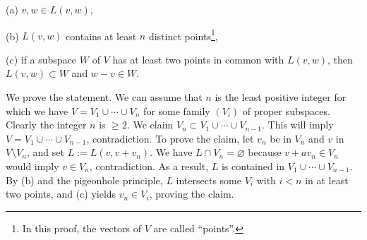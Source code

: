 \documentclass[11pt,letterpaper]{article}
\newcommand{\noi}{\noindent}%
\newcommand{\sm}{\setminus}
\begin{document}
\noi(a) $v,w\in L(v,w)$, 

\noi(b) $L(v,w)$ contains at least $n$ distinct points\footnote{In this proof, the vectors of $V$ are called ``points''.}, 

\noi(c) if a subspace $W$ of $V$ has at least two points in common with $L(v,w)$, then $L(v,w)\subset W$ and $w-v\in W$. 

\noi We prove the statement. We can assume that $n$ is the least positive integer for which we have $V=V_1\cup\cdots\cup V_n$ for some family $(V_i)$ of proper subspaces. Clearly the integer $n$ is $\ge2$. We claim $V_n\subset V_1\cup\cdots\cup V_{n-1}$. This will imply $V=V_1\cup\cdots\cup V_{n-1}$, contradiction. To prove the claim, let $v_n$ be in $V_n$ and $v$ in $V\sm V_n$, and set $L:=L(v,v+v_n)$. We have $L\cap V_n=\varnothing$ because $v+av_n\in V_n$ would imply $v\in V_n$, contradiction. As a result, $L$ is contained in $V_1\cup\cdots\cup V_{n-1}$. By (b) and the pigeonhole principle, $L$ intersects some $V_i$ with $i<n$ in at least two points, and (c) yields $v_n\in V_i$, proving the claim. 
\end{document}
